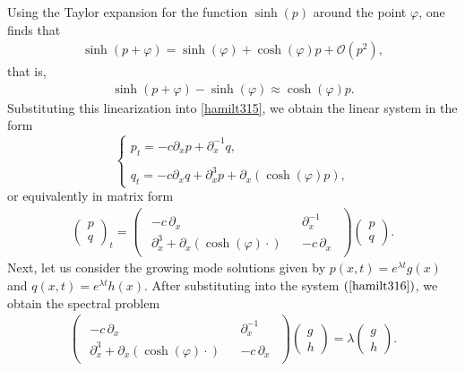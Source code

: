 \documentclass[12pt,reqno,a4paper]{amsart} %
\numberwithin{equation}{section}
\numberwithin{figure}{section}
\begin{document}
 Using the Taylor expansion for the function $\sinh(p)$ around the point $\varphi$, one finds that 
 \begin{align*}
 	\sinh(p+\varphi)=\sinh(\varphi)+\cosh(\varphi)p +\mathcal{O}(p^2), 
 \end{align*}that is, 
 \begin{align*}
 	\sinh(p+\varphi)-\sinh(\varphi)\approx\cosh(\varphi)p .
 \end{align*}
 Substituting this linearization into \eqref{hamilt315}, we obtain the linear system in the form 
 \begin{equation}
 	\left\{\begin{array}{lll}
 		 p_t =-c\partial_x p+\partial_x^{-1 }q, \\ \\
 	     q_t =-c\partial_x q+\partial_x^3 p+\partial_x(\cosh(\varphi)p),
 	\end{array}\right.\label{syspert}	
 \end{equation} or equivalently in matrix form
 \begin{align}\label{hamilt316}
 	\begin{pmatrix}
 		p \\ q
 	\end{pmatrix}_t
 	=
 	\begin{pmatrix}
 		\begin{array}{ccc}
 			-c \, \partial_x && \partial_x^{-1} \\
 			\partial_x^3 + \partial_x(\cosh(\varphi)\cdot)  && -c \, \partial_x
 		\end{array}
 	\end{pmatrix}
 	\begin{pmatrix}
 		p \\ q
 	\end{pmatrix}.
 \end{align} 
 \indent Next, let us consider the growing mode solutions given by $p(x,t)=e^{\lambda t}g(x)$ and $q(x,t)=e^{\lambda t}h(x)$. After substituting into the system $(\ref{hamilt316})$, we obtain the spectral problem
 \begin{align}\label{hamilt3165}
 	\begin{pmatrix}
 		\begin{array}{ccc}
 			-c \, \partial_x && \partial_x^{-1} \\
 			\partial_x^3 + \partial_x(\cosh(\varphi)\cdot)  && -c \, \partial_x
 		\end{array}
 	\end{pmatrix}
 	\begin{pmatrix}
 		g \\ h
 	\end{pmatrix}=\lambda\begin{pmatrix}
 		g \\ h
 	\end{pmatrix}.
 	 \end{align} 
\end{document}
